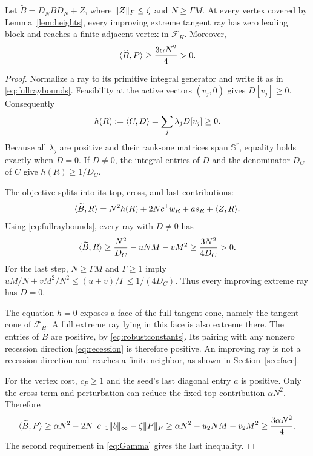 \begin{lemma}\label{lem:confinement}
Let $\widetilde B=D_NBD_N+Z$, where $\lVert Z\rVert_F\le\zeta$ and $N\ge\Gamma M$. At every vertex covered by Lemma~\ref{lem:heights}, every improving extreme tangent ray has zero leading block and reaches a finite adjacent vertex in $\mathcal F_H$. Moreover,
\begin{equation}\label{eq:vertexgap}
 \langle \widetilde B,P\rangle\ge\frac{3\alpha N^2}{4}>0.
\end{equation}
\end{lemma}
\begin{proof}
Normalize a ray to its primitive integral generator and write it as in \eqref{eq:fullraybounds}. Feasibility at the active vectors $(v_j,0)$ gives $D[v_j]\ge0$. Consequently
\[
 h(R):=\langle C,D\rangle=\sum_j\lambda_jD[v_j]\ge0.
\]
Because all $\lambda_j$ are positive and their rank-one matrices span $\mathbb S^r$, equality holds exactly when $D=0$. If $D\ne0$, the integral entries of $D$ and the denominator $D_C$ of $C$ give $h(R)\ge1/D_C$.

The objective splits into its top, cross, and last contributions:
\[
 \langle \widetilde B,R\rangle=N^2h(R)+2Nc^{\mathsf T} w_R+a s_R+\langle Z,R\rangle.
\]
Using \eqref{eq:fullraybounds}, every ray with $D\ne0$ has
\begin{equation}\label{eq:dominance}
 \langle \widetilde B,R\rangle
 \ge\frac{N^2}{D_C}-uNM-vM^2
 \ge\frac{3N^2}{4D_C}>0.
\end{equation}
For the last step, $N\ge\Gamma M$ and $\Gamma\ge1$ imply
$uM/N+vM^2/N^2\le(u+v)/\Gamma\le1/(4D_C)$.
Thus every improving extreme ray has $D=0$.

The equation $h=0$ exposes a face of the full tangent cone, namely the tangent cone of $\mathcal F_H$. A full extreme ray lying in this face is also extreme there. The entries of $\widetilde B$ are positive, by \eqref{eq:robustconstants}. Its pairing with any nonzero recession direction \eqref{eq:recession} is therefore positive. An improving ray is not a recession direction and reaches a finite neighbor, as shown in Section~\ref{sec:face}.

For the vertex cost, $c_P\ge1$ and the seed's last diagonal entry $a$ is positive. Only the cross term and perturbation can reduce the fixed top contribution $\alpha N^2$. Therefore
\[
 \langle \widetilde B,P\rangle\ge
 \alpha N^2-2N\lVert c\rVert_1\lVert b\rVert_\infty-\zeta\lVert P\rVert_F
 \ge\alpha N^2-u_2NM-v_2M^2
 \ge\frac{3\alpha N^2}{4}.
\]
The second requirement in \eqref{eq:Gamma} gives the last inequality.
\end{proof}

